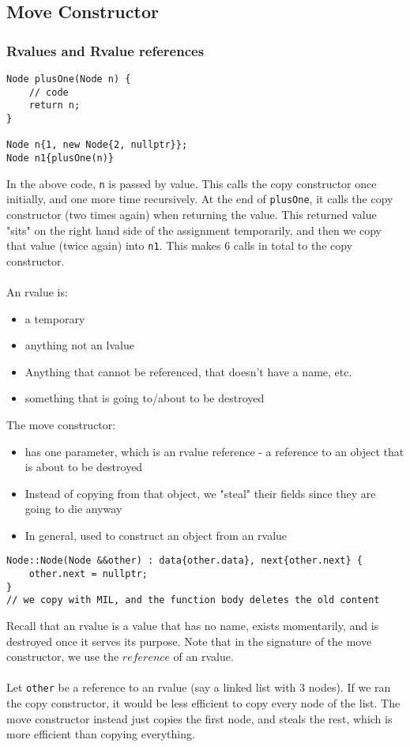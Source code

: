\documentclass[12pt]{article}
\begin{document}
\subsection{Move Constructor}
\subsubsection{Rvalues and Rvalue references}
\begin{lstlisting}
Node plusOne(Node n) {
    // code
    return n;
}

Node n{1, new Node{2, nullptr}};
Node n1{plusOne(n)}
\end{lstlisting}
In the above code, \lstinline{n} is passed by value. This calls the copy constructor once initially, and one more time recursively. At the end of \lstinline{plusOne}, it calls the copy constructor (two times again) when returning the value. This returned value "sits" on the right hand side of the assignment temporarily, and then we copy that value (twice again) into \lstinline{n1}. This makes 6 calls in total to the copy constructor.\\\\
An rvalue is:
\begin{itemize}
    \item a temporary
    \item anything not an lvalue
    \item Anything that cannot be referenced, that doesn't have a name, etc.
    \item something that is going to/about to be destroyed
\end{itemize}

The move constructor:
\begin{itemize}
    \item has one parameter, which is an rvalue reference - a reference to an object that is about to be destroyed
    \item Instead of copying from that object, we "steal" their fields since they are going to die anyway
    \item In general, used to construct an object from an rvalue
\end{itemize}

\begin{lstlisting}
Node::Node(Node &&other) : data{other.data}, next{other.next} {
    other.next = nullptr;
}
// we copy with MIL, and the function body deletes the old content
\end{lstlisting}

Recall that an rvalue is a value that has no name, exists momentarily, and is destroyed once it serves its purpose. Note that in the signature of the move constructor, we use the $reference$ of an rvalue.\\\\
Let \lstinline{other} be a reference to an rvalue (say a linked list with 3 nodes). If we ran the copy constructor, it would be less efficient to copy every node of the list. The move constructor instead just copies the first node, and steals the rest, which is more efficient than copying everything.
\end{document}
